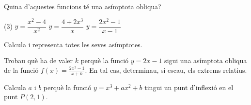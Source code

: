 \begin{mylist}
	
	\exer[2] Quina d'aquestes funcions té una asímptota obliqua?
	\begin{tasks}(3)
		\task $y=\dfrac{x^2-4}{x^2}$
		\task $y=\dfrac{4+2x^3}{x}$
		\task $y=\dfrac{2x^2-1}{x-1}$
	\end{tasks}
	Calcula i representa totes les seves asímptotes.
	
	\exer[2] Trobau què ha de valer $k$ perquè la funció $y=2x-1$ sigui una asímptota obliqua de la funció $f(x)=\frac{2x^2-1}{x+k}$. En tal cas, determinau, si escau, els extrems relatius.
	
	\exer[2] Calcula $a$ i $b$ perquè la funció  $y=x^3+ax^2+b$  tingui un punt d'inflexió en el punt \linebreak $P(2, 1)$.

	
\end{mylist}


